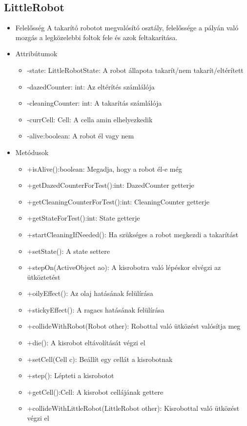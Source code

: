 \subsection{LittleRobot}
\begin{itemize}
	\item Felelősség\newline
	A takarító robotot megvalósító osztály, felelőssége a pályán való mozgás a legközelebbi foltok fele és azok feltakarítása.
	\item Attribútumok\newline
	\begin{itemize}
		\item -state: LittleRobotState: A robot állapota takarít/nem takarít/eltérített
		\item -dazedCounter: int: Az eltérítés számlálója
		\item -cleaningCounter: int: A takarítás számlálója
		\item -currCell: Cell: A cella amin elhelyezkedik
		\item -alive:boolean: A robot él vagy nem
	\end{itemize}
	\item Metódusok\newline
	\begin{itemize}
		\item +isAlive():boolean: Megadja, hogy a robot él-e még
		\item +getDazedCounterForTest():int: DazedCounter getterje
		\item +getCleaningCounterForTest():int: CleaningCounter getterje
		\item +getStateForTest():int: State getterje
		\item +startCleaningIfNeeded(): Ha szükséges a robot megkezdi a takarítást
		\item +setState(): A state settere
		\item +stepOn(ActiveObject ao): A kisrobotra való lépéskor elvégzi az ütköztetést
		\item +oilyEffect(): Az olaj hatásának felülírása
		\item +stickyEffect(): A ragacs hatásának felülírása
		\item +collideWithRobot(Robot other): Robottal való ütközést valósítja meg
		\item +die(): A kisrobot eltávolítását végzi el
		\item +setCell(Cell c): Beállít egy cellát a kisrobotnak
		\item +step(): Lépteti a kisrobotot
		\item +getCell():Cell: A kisrobot cellájának gettere
		\item +collideWithLittleRobot(LittleRobot other): Kisrobottal való ütközést végzi el
\end{itemize}


\end{itemize}
